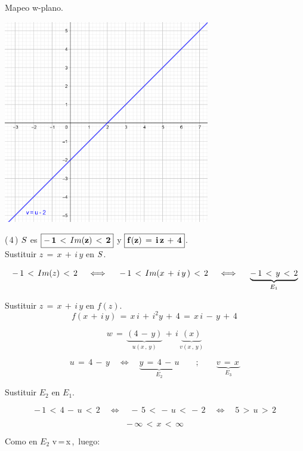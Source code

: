 \documentclass[a4paper,11pt,openany]{book}
\begin{document}
\textcolor{ao(english)}{} Mapeo w-plano.

\begin{center}
     \includegraphics[width=9cm]{Mapeo-Ej-3-w.png}
\end{center}

\textcolor{ao(english)}{(\,4\,)} $\mathnormal{S}$ es $\boxed{\bf{-\,1\,<\,\mathnormal{Im}(z)\,<\,2}}$ y $\boxed{\bf{f(z)\,=\,i\,z\,+\,4}}$.\\

\textcolor{ao(english)}{} Sustituir $z\,=\,x\,+\,i\,y$ en $\mathnormal{S}$.

$$-\,1\,<\,\mathnormal{Im}(z)\,<\,2 \quad\iff\quad\, -\,1\,<\,\mathnormal{Im}(x\,+\,i\,y\,)\,<\,2 \quad\iff\quad\, \underbrace{ -\,1\,<\,y\,<\,2 }_{E_{1}}$$

\textcolor{ao(english)}{} Sustituir $z\,=\,x\,+\,i\,y$ en $f(z)$.\\

$$f(x\,+\,i\,y)\,=\,x\,i\,+\,i^{2}y\,+\,4\,=\,x\,i\,-\,y\,+\,4\,$$

$$w\,=\,\underbrace{(4\,-\,y)}_{u(x\,,\,y)}\,+\,i\,\underbrace{(x)}_{v(x\,,\,y)}$$

$$u\,=\,4\,-\,y\quad\iff\quad \underbrace{y\,=\,4\,-\,u}_{E_{2}} \qquad;\qquad \underbrace{v\,=\,x\,}_{E_{3}}$$

\textcolor{ao(english)}{} Sustituir $E_{2}$ en $E_{1}$.

$$-\,1\,<\,4\,-\,u\,<\,2 \quad\iff\quad -\,5\,<\,-\,u\,<\,-\,2 \quad\iff\quad 5\,>\,u\,>\,2$$

$$-\,\infty\,<\,x\,<\,\infty$$

\textcolor{ao(english)}{} Como en $E_{2}$ v\,=\,x\,,\, luego:
\end{document}
